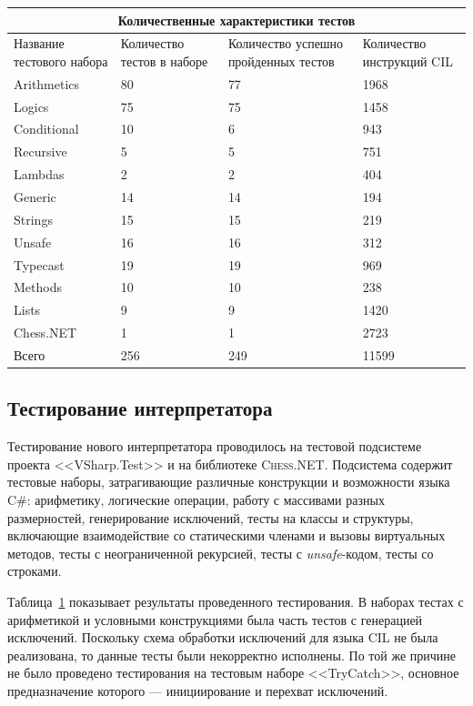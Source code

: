 \begin{table}[t]
    \centering
    \begin{tabular}{ |p{3cm}||p{2cm}|p{2cm}|p{2cm}|  }
        \hline
        \multicolumn{4}{|c|}{Количественные характеристики тестов} \\
        \hline
        Название тестового набора &Количество тестов в наборе&Количество успешно пройденных тестов&Количество инструкций CIL\\
        \hline
        Arithmetics   &80    &77    &1968\\
        Logics        &75    &75    &1458\\
        Conditional   &10    &6     &943\\
        Recursive     &5     &5     &751\\
        Lambdas       &2     &2     &404\\
        Generic       &14    &14    &194\\
        Strings       &15    &15    &219\\
        Unsafe        &16    &16    &312\\
        Typecast      &19    &19    &969\\
        Methods       &10    &10    &238\\
        Lists         &9     &9     &1420\\
        Chess.NET     &1     &1     &2723\\
        \hline
        Всего         &256   &249   &11599\\
        \hline
    \end{tabular}
    \label{experiments}
\end{table}


\FloatBarrier

\subsection{Тестирование интерпретатора}
Тестирование нового интерпретатора проводилось на тестовой подсистеме проекта <<VSharp.Test>> и на библиотеке \textsc{Chess.NET}.
Подсистема содержит тестовые наборы, затрагивающие различные конструкции и возможности языка C\#:
арифметику, логические операции,
работу с массивами разных размерностей, генерирование исключений, тесты на классы и структуры, включающие взаимодействие со статическими членами и вызовы виртуальных методов,
тесты с неограниченной рекурсией, тесты с \emph{unsafe}-кодом, тесты со строками. 

Таблица~\ref{experiments} показывает результаты проведенного тестирования. 
В наборах тестах с арифметикой и условными конструкциями была часть тестов с генерацией исключений. 
Поскольку схема обработки исключений для языка CIL не была реализована, то данные тесты были некорректно исполнены.
По той же причине не было проведено тестирования на тестовым наборе <<TryCatch>>, 
основное предназначение которого --- инициирование и перехват исключений.
